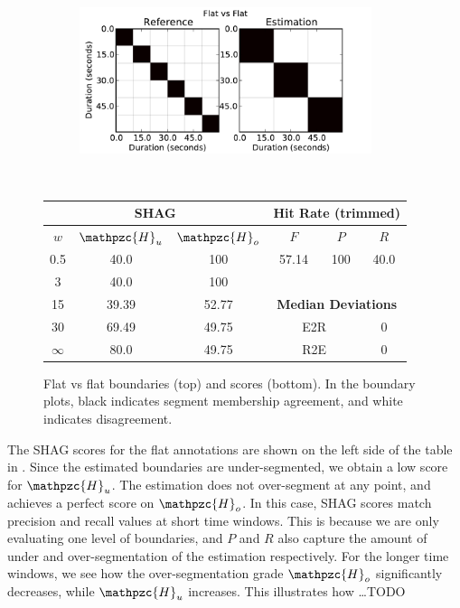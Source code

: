 \documentclass{article}
\def\shag{\ensuremath{\mathpzc{H}}}
\begin{document}
\begin{figure}
  \centering
  \begin{subfigure}{0.5\textwidth}
    \centering
    \includegraphics[width=0.94\textwidth]{plots/flat-flat.pdf}
  \end{subfigure}%
  \\
  \begin{minipage}{0.5\textwidth}
    \centering
    \vspace{10pt}
    \begin{tabular}{|c|c|c||c|c|c|}
      \hline
      \multicolumn{3}{|c||}{\textbf{SHAG}} & \multicolumn{3}{c|}{\textbf{Hit Rate (trimmed)}} \\
      \hline
      $w$ & $\shag_u$   & $\shag_o$ & $F$     & $P$     & $R$ \\
      \hline
      0.5       & 40.0   & 100   & 57.14  & 100 & 40.0 \\
      \cline{4-6}
      3         & 40.0   & 100  \\
      \cline{4-6}
      15        & 39.39  & 52.77 & \multicolumn{3}{c|}{\textbf{Median Deviations}}   \\
      \cline{4-6}
      30        & 69.49  & 49.75 & \multicolumn{2}{c|}{E2R} & 0 \\
      $\infty$  & 80.0   & 49.75 & \multicolumn{2}{c|}{R2E} & 0 \\  
      \hline
    \end{tabular}
  \end{minipage}
  \caption{Flat vs flat boundaries (top) and scores (bottom).  In the boundary plots, black indicates segment membership agreement, and white indicates disagreement.}
  \label{fig:flat-flat}
\end{figure}

The SHAG scores for the flat annotations are shown on the left side of the table in .
Since the estimated boundaries are under-segmented, we obtain a low score for $\shag_u$. The estimation does not over-segment at any point, and achieves a perfect score on $\shag_o$.
In this case, SHAG scores match precision and recall values at short time windows. This is because we are only evaluating one level of boundaries, and $P$ and $R$
also capture the amount of under and over-segmentation of the estimation respectively.
For the longer time windows, we see how the over-segmentation grade $\shag_o$ significantly decreases, while $\shag_u$ increases.
This illustrates how \dots TODO
\end{document}
